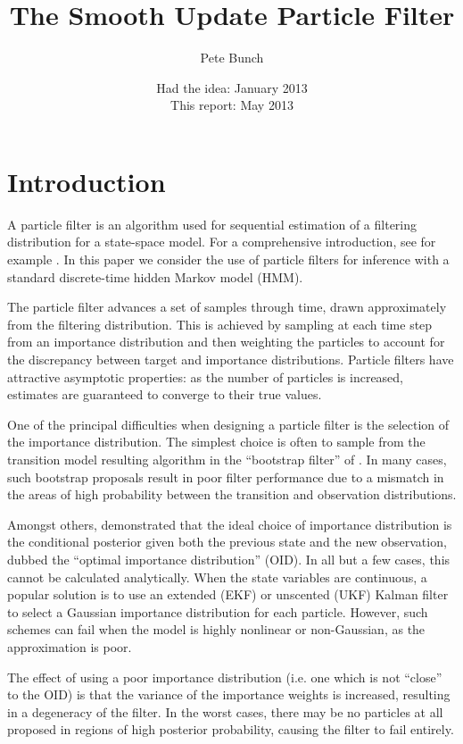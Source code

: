 \documentclass[a4paper,10pt]{article}
\title{The Smooth Update Particle Filter}
\author{Pete Bunch}
\date{Had the idea: January 2013 \\ This report: May 2013}
\begin{document}
\maketitle

\begin{abstract}
\end{abstract}

\section{Introduction}

A particle filter is an algorithm used for sequential estimation of a filtering distribution for a state-space model. For a comprehensive introduction, see for example \cite{Cappe2007,Doucet2009}. In this paper we consider the use of particle filters for inference with a standard discrete-time hidden Markov model (HMM).

The particle filter advances a set of samples through time, drawn approximately from the filtering distribution. This is achieved by sampling at each time step from an importance distribution and then weighting the particles to account for the discrepancy between target and importance distributions. Particle filters have attractive asymptotic properties: as the number of particles is increased, estimates are guaranteed to converge to their true values.

One of the principal difficulties when designing a particle filter is the selection of the importance distribution. The simplest choice is often to sample from the transition model resulting algorithm in the ``bootstrap filter'' of \cite{Gordon1993}. In many cases, such bootstrap proposals result in poor filter performance due to a mismatch in the areas of high probability between the transition and observation distributions.

Amongst others, \cite{Doucet2000a} demonstrated that the ideal choice of importance distribution is the conditional posterior given both the previous state and the new observation, dubbed the ``optimal importance distribution'' (OID). In all but a few cases, this cannot be calculated analytically. When the state variables are continuous, a popular solution is to use an extended (EKF) or unscented (UKF) Kalman filter to select a Gaussian importance distribution for each particle. However, such schemes can fail when the model is highly nonlinear or non-Gaussian, as the approximation is poor.

The effect of using a poor importance distribution (i.e. one which is not ``close'' to the OID) is that the variance of the importance weights is increased, resulting in a degeneracy of the filter. In the worst cases, there may be no particles at all proposed in regions of high posterior probability, causing the filter to fail entirely.
\end{document}
